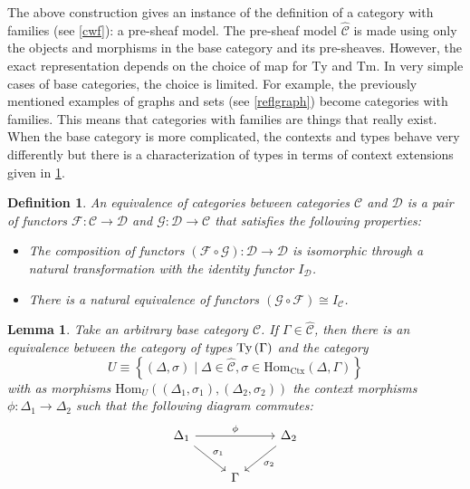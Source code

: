 \documentclass[12pt,a4paper,twoside,xetex]{book} %
\newcommand{\keyword}[1]{\emph{#1}\index{#1}}
\newtheorem{lemma}[theorem]{Lemma}
\newtheorem{definition}[theorem]{Definition}
\newcommand{\psh}[1]{\widehat{#1}}
\newcommand{\homo}[3]{\text{Hom}_{#1}\left(#2,#3\right)}
\begin{document}
The above construction gives an instance of the definition of a category with 
families (see \cref{cwf}): a pre-sheaf model. The pre-sheaf model $\psh{\mathcal{C}}$ is made using only the 
objects and morphisms in the base category and its pre-sheaves. However, the 
exact representation depends on the choice of map for $\text{Ty}$ and 
$\text{Tm}$. In very simple cases of base categories, the choice is limited. 
For example, the previously mentioned examples of graphs and sets (see \cref{reflgraph}) become 
categories with families. This means that categories with families are things 
that really exist. When the base category is more complicated, the contexts and 
types behave very differently but there is a characterization of types in terms 
of context extensions given in \cref{typelemma}.

\begin{definition}
An \keyword{equivalence of categories} between categories $\mathcal{C}$ and 
$\mathcal{D}$ is a pair of functors $\mathcal{F}:\mathcal{C} \rightarrow 
\mathcal{D}$ and $\mathcal{G}:\mathcal{D} \rightarrow \mathcal{C}$ that 
satisfies the following properties:
\begin{itemize}

\item The composition of functors $(\mathcal{F} \circ \mathcal{G}) : 
\mathcal{D} \rightarrow \mathcal{D}$ is isomorphic through a natural 
transformation with the identity functor $I_{\mathcal{D}}$. 

\item There is a natural equivalence of functors $(\mathcal{G} \circ 
\mathcal{F}) \cong I_{\mathcal{C}}$.
\end{itemize} 
\end{definition}

\begin{lemma}\label{typelemma}
Take an arbitrary base category $\mathcal{C}$. If $\Gamma \in 
\psh{\mathcal{C}}$, then there is an equivalence between the  category of types 
$\text{Ty}\left(\Gamma\right)$ and the category $$ U \equiv \left\{ (\Delta, \sigma) \mid \Delta 
\in \psh{\mathcal{C}}, \sigma \in \text{Hom}_{\text{Ctx}}(\Delta , \Gamma) 
\right\}$$ with as morphisms $\homo{U}{(\Delta_1, \sigma_1)}{(\Delta_2, 
\sigma_2)}$ the context morphisms $\phi: \Delta _1 \rightarrow \Delta _2$ such 
that the following diagram commutes: 
\[ \begin{tikzcd}
\Delta_1 \arrow[dr, "\sigma_1"] \arrow[rr, "\phi"]
& & \Delta_2
\arrow[dl, "\sigma_2"] \\
& \Gamma 
\end{tikzcd}
\]

\end{lemma}
\end{document}

